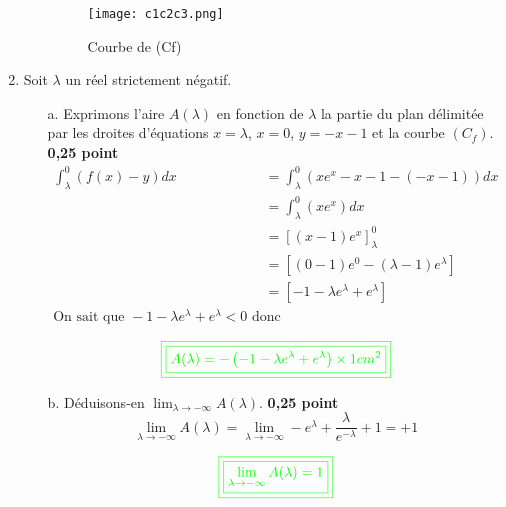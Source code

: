 \documentclass[12pt]{article}
\begin{document}
\begin{enumerate}
\begin{enumerate}
\begin{figure}[h]
\centering
\texttt{[image: c1c2c3.png]}
\caption{Courbe de (Cf)}
\label{fig:monimage}
\end{figure}
\end{enumerate}
\newpage
\item Soit $\lambda$ un réel strictement négatif.
\begin{enumerate}
\item[a.] Exprimons l'aire $A(\lambda)$ en fonction de $\lambda$ la partie du plan délimitée par les droites d'équations $x=\lambda$, $x=0$, $y=-x-1$ et la courbe $(C_{f})$. \textbf{ 0,25 point}
\begin{align*}
\int_{\lambda}^{0}\left( f(x)-y \right)dx &=\int_{\lambda}^{0}\left( xe^{x}-x-1-(-x-1) \right)dx\\
&=\int_{\lambda}^{0}\left( xe^{x}\right)dx\\
&=\left[\left( x-1\right) e^{x}\right]_{\lambda}^{0} \\
&=\left[\left( 0-1\right) e^{0}-\left( \lambda-1\right) e^{\lambda}\right] \\
&=\left[-1-\lambda e^{\lambda}+e^{\lambda}\right] \\
\text{On sait que }-1-\lambda e^{\lambda}+e^{\lambda}<0 \text{ donc }
\end{align*}

\[\textcolor{green}{\boxed{\boxed{A(\lambda)=-\left( -1-\lambda e^{\lambda}+e^{\lambda} \right)\times 1cm^{2}}}}\]

\item[b.] Déduisons-en $\lim_{\lambda \to -\infty}A(\lambda)$. \textbf{ 0,25 point}
\[
\lim_{\lambda \to -\infty}A(\lambda)=
\lim_{\lambda \to -\infty}-e^{\lambda}+\frac{\lambda}{e^{-\lambda}}+1=+1
\]

\[\textcolor{green}{\boxed{\boxed{\lim_{\lambda \to -\infty}A(\lambda)=1}}}\]
\end{enumerate}
\end{enumerate}
\end{document}
